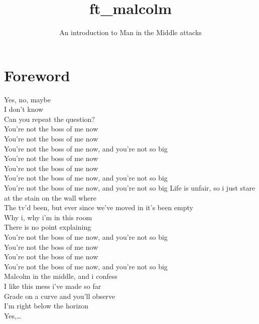 \documentclass{42-en}
\begin{document}
                           \title{ft\_malcolm}
                          \subtitle{An introduction to Man in the Middle attacks}

\maketitle

\tableofcontents


\chapter{Foreword}

    Yes, no, maybe\\
    I don't know\\
    Can you repeat the question?\\

    You're not the boss of me now\\
    You're not the boss of me now\\
    You're not the boss of me now, and you're not so big\\
    You're not the boss of me now\\
    You're not the boss of me now\\
    You're not the boss of me now, and you're not so big\\
    You're not the boss of me now, and you're not so big
    Life is unfair, so i just stare at the stain on the wall where\\
    The tv'd been, but ever since we've moved in it's been empty\\
    Why i, why i'm in this room\\
    There is no point explaining\\

    You're not the boss of me now, and you're not so big\\
    You're not the boss of me now\\
    You're not the boss of me now\\
    You're not the boss of me now, and you're not so big\\
    Malcolm in the middle, and i confess\\
    I like this mess i've made so far\\
    Grade on a curve and you'll observe\\
    I'm right below the horizon\\
    Yes,… \\
\end{document}
